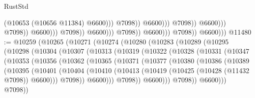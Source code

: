 \begin{lexlean}{RustStd}
\begin{coremodule}
                                                                    (@10653 (@10656 @11384) @6600)))
                                                                @7098))
                                                            @6600)))
                                                      @7098))
                                                  @6600)))
                                            @7098))
                                        @6600)))
                                  @7098))
                              @6600)))
                        @7098))
                    @6600)))
              @7098))
          @6600)))
@11480 := @10259
    (@10265
      (@10271
        (@10274
          (@10280
            (@10283
              (@10289
                (@10295
                  (@10298
                    (@10304
                      (@10307
                        (@10313
                          (@10319
                            (@10322
                              (@10328
                                (@10331
                                  (@10347
                                    (@10353
                                      (@10356
                                        (@10362
                                          (@10365
                                            (@10371
                                              (@10377
                                                (@10380
                                                  (@10386
                                                    (@10389
                                                      (@10395
                                                        (@10401
                                                          (@10404
                                                            (@10410
                                                              (@10413
                                                                (@10419
                                                                  (@10425
                                                                    (@10428 (@11432 @7098))
                                                                    @6600)))
                                                              @7098))
                                                          @6600)))
                                                    @7098))
                                                @6600)))
                                          @7098))
                                      @6600)))
                                @7098))

\end{coremodule}
\end{lexlean}
